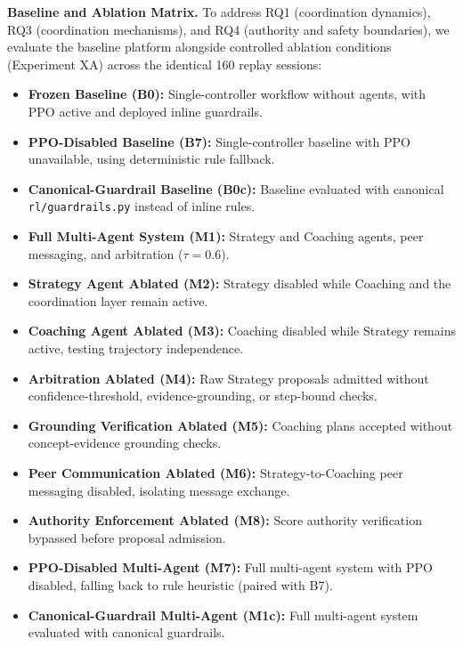 \documentclass[runningheads]{llncs}
\begin{document}
\textbf{Baseline and Ablation Matrix.} To address RQ1 (coordination dynamics), RQ3 (coordination mechanisms), and RQ4 (authority and safety boundaries), we evaluate the baseline platform alongside controlled ablation conditions (Experiment XA) across the identical 160 replay sessions:
\begin{itemize}
\item \textbf{Frozen Baseline (B0):} Single-controller workflow without agents, with PPO active and deployed inline guardrails.
\item \textbf{PPO-Disabled Baseline (B7):} Single-controller baseline with PPO unavailable, using deterministic rule fallback.
\item \textbf{Canonical-Guardrail Baseline (B0c):} Baseline evaluated with canonical \texttt{rl/guardrails.py} instead of inline rules.
\item \textbf{Full Multi-Agent System (M1):} Strategy and Coaching agents, peer messaging, and arbitration ($\tau=0.6$).
\item \textbf{Strategy Agent Ablated (M2):} Strategy disabled while Coaching and the coordination layer remain active.
\item \textbf{Coaching Agent Ablated (M3):} Coaching disabled while Strategy remains active, testing trajectory independence.
\item \textbf{Arbitration Ablated (M4):} Raw Strategy proposals admitted without confidence-threshold, evidence-grounding, or step-bound checks.
\item \textbf{Grounding Verification Ablated (M5):} Coaching plans accepted without concept-evidence grounding checks.
\item \textbf{Peer Communication Ablated (M6):} Strategy-to-Coaching peer messaging disabled, isolating message exchange.
\item \textbf{Authority Enforcement Ablated (M8):} Score authority verification bypassed before proposal admission.
\item \textbf{PPO-Disabled Multi-Agent (M7):} Full multi-agent system with PPO disabled, falling back to rule heuristic (paired with B7).
\item \textbf{Canonical-Guardrail Multi-Agent (M1c):} Full multi-agent system evaluated with canonical guardrails.
\end{itemize}
\end{document}
